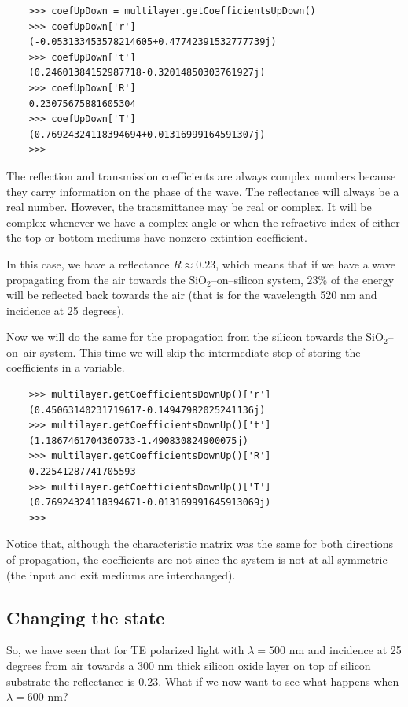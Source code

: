 \documentclass[a4paper,11pt,aps,final]{revtex4}
\begin{document}
\begin{verbatim}
    >>> coefUpDown = multilayer.getCoefficientsUpDown()
    >>> coefUpDown['r']
    (-0.053133453578214605+0.47742391532777739j)
    >>> coefUpDown['t']
    (0.24601384152987718-0.32014850303761927j)
    >>> coefUpDown['R']
    0.23075675881605304
    >>> coefUpDown['T']
    (0.76924324118394694+0.01316999164591307j)
    >>>
\end{verbatim}

The reflection and transmission coefficients are always complex numbers because they carry information on the phase of the wave. The reflectance will always be a real number. However, the transmittance may be real or complex. It will be complex whenever we have a complex angle or when the refractive index of either the top or bottom mediums have nonzero extintion coefficient.

In this case, we have a reflectance $R \approx 0.23$, which means that if we have a wave propagating from the air towards the SiO$_2$--on--silicon system, 23\% of the energy will be reflected back towards the air (that is for the wavelength 520 nm and incidence at 25 degrees).

Now we will do the same for the propagation from the silicon towards the SiO$_2$--on--air system. This time we will skip the intermediate step of storing the coefficients in a variable.

\begin{verbatim}
    >>> multilayer.getCoefficientsDownUp()['r']
    (0.45063140231719617-0.14947982025241136j)
    >>> multilayer.getCoefficientsDownUp()['t']
    (1.1867461704360733-1.490830824900075j)
    >>> multilayer.getCoefficientsDownUp()['R']
    0.22541287741705593
    >>> multilayer.getCoefficientsDownUp()['T']
    (0.76924324118394671-0.013169991645913069j)
    >>>
\end{verbatim}

Notice that, although the characteristic matrix was the same for both directions of propagation, the coefficients are not since the system is not at all symmetric (the input and exit mediums are interchanged).

\subsection{Changing the state}

So, we have seen that for TE polarized light with $\lambda = 500$ nm and incidence at 25 degrees from air towards a 300 nm thick silicon oxide layer on top of silicon substrate the reflectance is 0.23. What if we now want to see what happens when $\lambda = 600$ nm?
\end{document}

